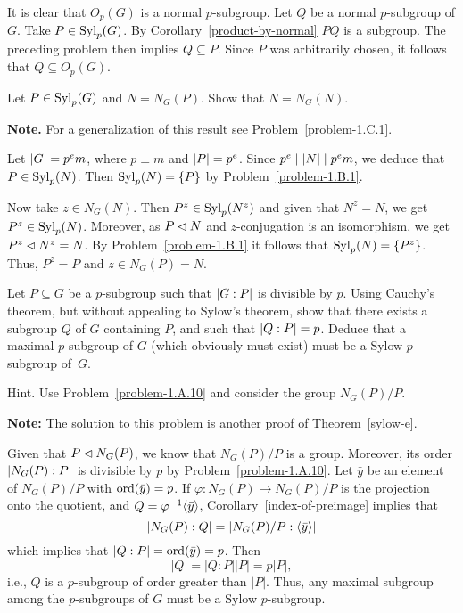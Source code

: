 \begin{solution} It is clear that $O_p(G)$ is a normal $p$-subgroup. Let $Q$ be a normal $p$-subgroup of $G$. Take $P\in{\rm Syl}_p(G)$. By Corollary~\ref{product-by-normal} $PQ$ is a subgroup. The preceding problem then implies $Q\subseteq P$. Since $P$ was arbitrarily chosen, it follows that $Q\subseteq O_p(G)$.  \end{solution}

\begin{probl}\label{problem-1.B.3}
    Let $P \in{\rm Syl}_p(G)$ and $N = N_G(P)$. Show that $N = N_G(N)$.

    \textrm{\rm{\bf Note.} For a generalization of this result see Problem~\ref{problem-1.C.1}.}
\end{probl}

\begin{solution} Let $\left\vert{G}\right\vert=p^em$, where $p\perp m$ and $\left\vert{P}\right\vert=p^e$. Since $p^e\mid\left\vert{N}\right\vert\mid p^em$, we deduce that $P\in{\rm Syl}_p(N)$. Then ${\rm Syl}_p(N)=\{P\}$ by Problem~\ref{problem-1.B.1}.

Now take $z\in N_G(N)$. Then $P^z\in{\rm Syl}_p(N^z)$ and given that $N^z=N$, we get $P^z\in{\rm Syl}_p(N)$. Moreover, as $P\lhd N$ and $z$-conjugation is an isomorphism, we get $P^z\lhd N^z=N$. By Problem~\ref{problem-1.B.1} it follows that ${\rm Syl}_p(N)=\{P^z\}$. Thus, $P^z=P$ and $z\in N_G(P)=N$.

\end{solution}

\begin{probl}\label{sylow-e-2}
    Let\/ $P\subseteq G$ be a $p$-subgroup such that $\left\vert{G:P}\right\vert$ is divisible by\/ $p$. Using Cauchy's theorem, but without appealing to Sylow's theorem, show that there exists a subgroup\/ $Q$ of\/ $G$ containing\/ $P$, and such that\/ $\left\vert{Q:P}\right\vert=p$. Deduce that a maximal $p$-subgroup of\/ $G$ (which obviously must exist) must be a Sylow $p$-subgroup of\/~$G$.

    \textrm{\rm Hint. Use Problem~\ref{problem-1.A.10} and consider the group $N_G(P)/P$.}
\end{probl}

    \textrm{{\bf Note:} The solution to this problem is another proof of Theorem~\ref{sylow-e}.}
    
\begin{solution} Given that $P\lhd N_G(P)$, we know that $N_G(P)/P$ is a group. Moreover, its order $\left\vert{N_G(P):P}\right\vert$ is divisible by $p$ by Problem~\ref{problem-1.A.10}. Let $\bar y$ be an element of $N_G(P)/P$ with ${\rm ord}(\bar y)=p$. If $\varphi\colon N_G(P)\to N_G(P)/P$ is the projection onto the quotient, and $Q=\varphi^{-1}\langle\bar y\rangle$, Corollary~\ref{index-of-preimage} implies that
$$
    |N_G(P):Q|=|N_G(P)/P:\langle\bar y\rangle|
$$
which implies that $|Q:P|={\rm ord}(\bar y)=p$. Then
$$
    |Q|=|Q:P||P|=p|P|,
$$
i.e., $Q$ is a $p$-subgroup of order greater than $|P|$. Thus, any maximal subgroup among the $p$-subgroups of $G$ must be a Sylow $p$-subgroup.

\end{solution}


